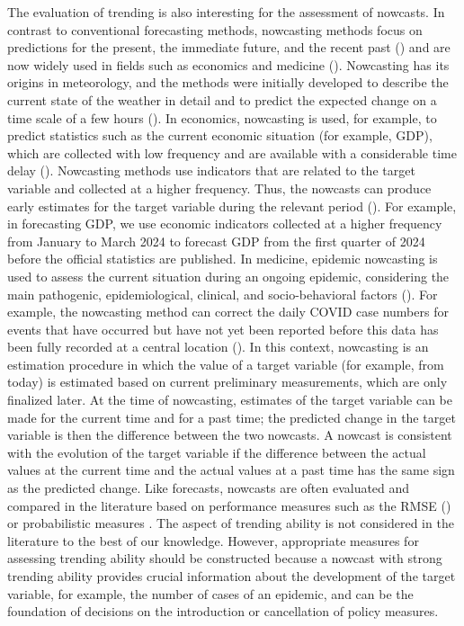 The evaluation of trending is also interesting for the assessment of nowcasts.
In contrast to conventional forecasting methods, nowcasting methods focus on predictions for the present, the immediate future, and the recent past (\cite{banbura2013now}) and are now widely used in fields such as economics and medicine (\cite{bok2018macroeconomic, wolffram2023collaborative}).
Nowcasting has its origins in meteorology, and the methods were initially developed to describe the current state of the weather in detail and to predict the expected change on a time scale of a few hours (\cite{browning1989nowcasting,schmid2019nowcasting}). In economics, nowcasting is used, for example, to predict statistics such as the current economic situation (for example, GDP), which are collected with low frequency and are available with a considerable time delay (\cite{banbura2013now}).
Nowcasting methods use indicators that are related to the target variable and collected at a higher frequency.
Thus, the nowcasts can produce early estimates for the target variable during the relevant period (\cite{castle2017forecasting}). For example, in forecasting GDP, we use economic indicators collected at a higher frequency from January to March 2024 to forecast GDP from the first quarter of 2024 before the official statistics are published.
In medicine, epidemic nowcasting is used to assess the current situation during an ongoing epidemic, considering the main pathogenic, epidemiological, clinical, and socio-behavioral factors (\cite{wu2021nowcasting}). 
For example, the nowcasting method can correct the daily COVID case numbers for events that have occurred but have not yet been reported before this data has been fully recorded at a central location (\cite{gunther2021nowcasting}). 
In this context, nowcasting is an estimation procedure in which the value of a target variable (for example, from today) is estimated based on current preliminary measurements, which are only finalized later. 
At the time of nowcasting, estimates of the target variable can be made for the current time and for a past time; the predicted change in the target variable is then the difference between the two nowcasts. A nowcast is consistent with the evolution of the target variable if the difference between the actual values at the current time and the actual values at a past time has the same sign as the predicted change. Like forecasts, nowcasts are often evaluated and compared in the literature based on performance measures such as the RMSE (\cite{gunther2021nowcasting}) or probabilistic measures \parencite{Wolffram2023}. The aspect of trending ability is not considered in the literature to the best of our knowledge. However, appropriate measures for assessing trending ability should be constructed because a nowcast with strong trending ability provides crucial information about the development of the target variable, for example, the number of cases of an epidemic, and can be the foundation of decisions on the introduction or cancellation of policy measures.

